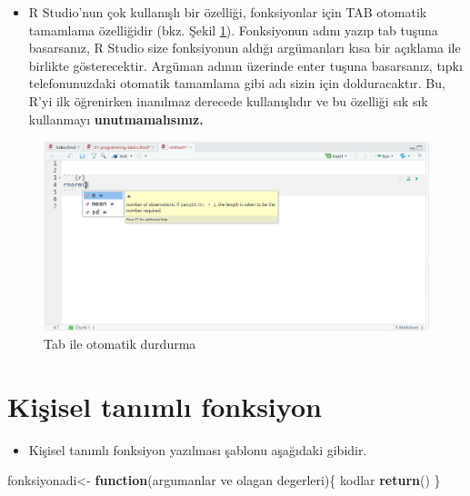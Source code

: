 \documentclass[
  oneside]{book}
\newenvironment{Shaded}{\begin{snugshade}}{\end{snugshade}}
\newcommand{\ControlFlowTok}[1]{\textcolor[rgb]{0.13,0.29,0.53}{\textbf{#1}}}
\newcommand{\FunctionTok}[1]{\textcolor[rgb]{0.13,0.29,0.53}{\textbf{#1}}}
\newcommand{\NormalTok}[1]{#1}
\newcommand{\OtherTok}[1]{\textcolor[rgb]{0.56,0.35,0.01}{#1}}
\providecommand{\tightlist}{%
  \setlength{\itemsep}{0pt}\setlength{\parskip}{0pt}}
\begin{document}
\begin{itemize}
\tightlist
\item
  R Studio'nun çok kullanışlı bir özelliği, fonksiyonlar için TAB otomatik tamamlama özelliğidir (bkz. Şekil \ref{fig:img-autocomplete}). Fonksiyonun adını yazıp tab tuşuna basarsanız, R Studio size fonksiyonun aldığı argümanları kısa bir açıklama ile birlikte gösterecektir. Argüman adının üzerinde enter tuşuna basarsanız, tıpkı telefonunuzdaki otomatik tamamlama gibi adı sizin için dolduracaktır. Bu, R'yi ilk öğrenirken inanılmaz derecede kullanışlıdır ve bu özelliği sık sık kullanmayı \textbf{unutmamalısınız.}
\end{itemize}

\begin{figure}

{\centering \includegraphics[width=1\linewidth]{images/autocomplete} 

}

\caption{Tab ile otomatik durdurma}\label{fig:img-autocomplete}
\end{figure}

\hypertarget{kiux15fisel-tanux131mlux131-fonksiyon}{%
\section{Kişisel tanımlı fonksiyon}\label{kiux15fisel-tanux131mlux131-fonksiyon}}

\begin{itemize}
\tightlist
\item
  Kişisel tanımlı fonksiyon yazılması şablonu aşağıdaki gibidir.
\end{itemize}

\begin{Shaded}
\begin{Highlighting}[]
\NormalTok{fonksiyonadi}\OtherTok{\textless{}{-}}  \ControlFlowTok{function}\NormalTok{(argumanlar ve olagan degerleri)\{}
\NormalTok{  kodlar}
  \FunctionTok{return}\NormalTok{()}
\NormalTok{\}}
\end{Highlighting}
\end{Shaded}
\end{document}
